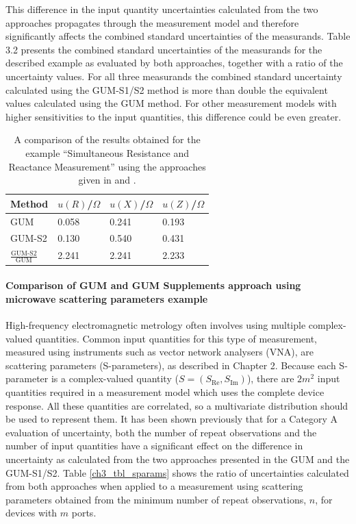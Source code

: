 \documentclass[../thesis/thesis.tex]{subfiles}
\begin{document}
\begin{refsection}
This difference in the input quantity uncertainties calculated from the two approaches propagates through the measurement model and therefore significantly affects the combined standard uncertainties of the measurands. Table 3.2 presents the combined standard uncertainties of the measurands for the described example as evaluated by both approaches, together with a ratio of the uncertainty values. For all three measurands the combined standard uncertainty calculated using the GUM-S1/S2 method is more than double the equivalent values calculated using the GUM method. For other measurement models with higher sensitivities to the input quantities, this difference could be even greater.

\begin{table}[]
	\begin{tabular}{llll} \toprule
		Method             & $u(R)$/$\Omega$  & $u(X)$/$\Omega$   & $u(Z)$/$\Omega$   \\ \midrule
		GUM                & 0.058 & 0.241 & 0.193 \\
		GUM-S2             & 0.130 & 0.540 & 0.431 \\ \midrule
		$\frac {\textrm{GUM-S2}}{\textrm{GUM}}$ & 2.241  & 2.241   & 2.233 \\ \bottomrule
	\end{tabular}
	\caption{A comparison of the results obtained for the example ``Simultaneous Resistance and Reactance Measurement'' using the approaches given in \cite[Example H.2]{GUM_2008} and \cite[Example 9.4]{GUM_S2}.}
	\label{ch3_tbl_gum_compare}
\end{table}

\paragraph{Comparison of GUM and GUM Supplements approach using microwave scattering parameters example}

High-frequency electromagnetic metrology often involves using multiple complex-valued quantities. Common input quantities for this type of measurement, measured using instruments such as vector network analysers (VNA), are scattering parameters (S-parameters), as described in Chapter 2. Because each S-parameter is a complex-valued quantity ($S = (S_{\textrm{Re}}, S_{\textrm{Im}})$), there are $2m^2$ input quantities required in a measurement model which uses the complete device response. All these quantities are correlated, so a multivariate distribution should be used to represent them. It has been shown previously that for a Category A evaluation of uncertainty, both the number of repeat observations and the number of input quantities have a significant effect on the difference in uncertainty as calculated from the two approaches presented in the GUM and the GUM-S1/S2. Table \ref{ch3_tbl_sparams} shows the ratio of uncertainties calculated from both approaches when applied to a measurement using scattering parameters obtained from the minimum number of repeat observations, $n$, for devices with $m$ ports.


\end{refsection}
\end{document}
